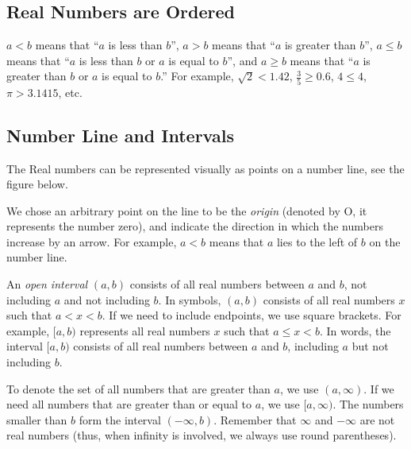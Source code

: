 \documentclass{ximera}
\begin{document}
\subsection*{Real Numbers are Ordered}
$a < b$ means that ``$a$ is less than $b$'', $a > b$ means that ``$a$ is greater than $b$'', $a \leq b$ means that ``$a$ is less than $b$ or $a$ is equal to $b$'', and $a \geq b$ means that ``$a$ is greater than $b$ or $a$ is equal to $b$.''  For example, $\sqrt{2} < 1.42$, $\displaystyle \frac{3}{5} \geq 0.6$, $4 \leq 4$, $\pi > 3.1415$, etc.

\subsection*{Number Line and Intervals}
The Real numbers can be represented visually as points on a number line, see the figure below.

\begin{image}
\end{image}

We chose an arbitrary point on the line to be the \emph{origin} (denoted by O, it represents the number zero), and indicate
the direction in which the numbers increase by an arrow.  For example, $a < b$ means that $a$ lies to the left of $b$ on the number line.

An \emph{open interval} $(a,b)$ consists of all real numbers between $a$ and $b$, not including $a$ and not including $b$.  In symbols, $(a,b)$
consists of all real numbers $x$ such that $a < x < b$.  If we need to include endpoints, we use square brackets. For example, $[a,b)$ represents all real
numbers $x$ such that $a \leq x < b$.  In words, the interval $[a,b)$ consists of all real numbers between $a$ and $b$, including $a$ but not including $b$.

To denote the set of all numbers that are greater than $a$, we use $(a, \infty)$.  If we need all numbers that are greater than or equal to $a$, we use
$[a,\infty)$.  The numbers smaller than $b$ form the interval $(-\infty, b)$.  Remember that $\infty$ and $-\infty$ are not real numbers (thus, when infinity is
involved, we always use round parentheses).
\end{document}
